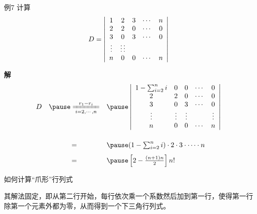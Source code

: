 \begin{frame}
  \begin{exampleblock}{例7}
    计算
    $$
     D= \left|
     \begin{array}{ccccc}
       1 &  2  & 3   &\cdots & n   \\
       2 &  2  & 0   &\cdots & 0  \\
       3 &  0  & 3   &\cdots & 0  \\
       \vdots & \vdots  \vdots  &    & \\
       n &  0  & 0   &\cdots & n
     \end{array}
     \right|
     $$
  \end{exampleblock}
\end{frame}


\begin{frame}
  \textbf{解}
  $$
  \begin{array}{rcl}
    D & \pause\xlongequal[i=2,\cd,n]{r_1-r_i} & \pause
    \left|
     \begin{array}{ccccc}
       1-\sum_{i=2}^n i &  0  & 0   &\cd & 0   \\
       2 &  2  & 0   &\cd & 0  \\
       3 &  0  & 3   &\cd & 0  \\
       \vd & \vd & \vd  &    &\vd  \\
       n &  0  & 0   &\cd & n
     \end{array}
     \right|\\[0.6in]
     &=& \pause (1-\sum_{i=2}^n i) \cdot 2 \cdot 3 \cdot \cd \cdot n \\[0.1in]
     &=& \pause \left[2-\frac{(n+1)n}2\right] n!
  \end{array} 
  $$
\end{frame}

\begin{frame}

  如何计算“爪形”行列式
  \begin{center}
  \end{center}
  \pause 
  其解法固定，即从第二行开始，每行依次乘一个系数然后加到第一行，使得第一行除第一个元素外都为零，从而得到一个下三角行列式。

\end{frame}


